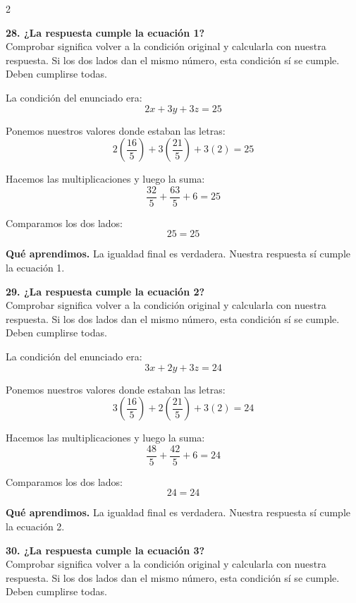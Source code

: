 \documentclass[11pt,a4paper,landscape]{article}
\begin{document}
\begin{multicols*}{2}
\begin{minipage}{\linewidth}
\end{minipage}\par\medskip
\noindent\begin{minipage}{\linewidth}\textbf{28. ¿La respuesta cumple la ecuación 1?}\\[2pt]Comprobar significa volver a la condición original y calcularla con nuestra respuesta. Si los dos lados dan el mismo número, esta condición sí se cumple. Deben cumplirse todas.
\par\smallskip La condición del enunciado era:
\[2x + 3y + 3z = 25\]
\par\smallskip Ponemos nuestros valores donde estaban las letras:
\[2\left(\frac{16}{5}\right) + 3\left(\frac{21}{5}\right) + 3\left(2\right)=25\]
\par\smallskip Hacemos las multiplicaciones y luego la suma:
\[\frac{32}{5} + \frac{63}{5} + 6=25\]
\par\smallskip Comparamos los dos lados:
\[25=25\]
\par\smallskip\textbf{Qué aprendimos.} La igualdad final es verdadera. Nuestra respuesta sí cumple la ecuación 1.
\end{minipage}\par\medskip
\noindent\begin{minipage}{\linewidth}\textbf{29. ¿La respuesta cumple la ecuación 2?}\\[2pt]Comprobar significa volver a la condición original y calcularla con nuestra respuesta. Si los dos lados dan el mismo número, esta condición sí se cumple. Deben cumplirse todas.
\par\smallskip La condición del enunciado era:
\[3x + 2y + 3z = 24\]
\par\smallskip Ponemos nuestros valores donde estaban las letras:
\[3\left(\frac{16}{5}\right) + 2\left(\frac{21}{5}\right) + 3\left(2\right)=24\]
\par\smallskip Hacemos las multiplicaciones y luego la suma:
\[\frac{48}{5} + \frac{42}{5} + 6=24\]
\par\smallskip Comparamos los dos lados:
\[24=24\]
\par\smallskip\textbf{Qué aprendimos.} La igualdad final es verdadera. Nuestra respuesta sí cumple la ecuación 2.
\end{minipage}\par\medskip
\noindent\begin{minipage}{\linewidth}\textbf{30. ¿La respuesta cumple la ecuación 3?}\\[2pt]Comprobar significa volver a la condición original y calcularla con nuestra respuesta. Si los dos lados dan el mismo número, esta condición sí se cumple. Deben cumplirse todas.

\end{minipage}
\end{multicols*}
\end{document}
